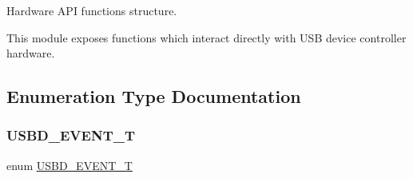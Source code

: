 Hardware A\+PI functions structure.

This module exposes functions which interact directly with U\+SB device controller hardware. 



\subsection{Enumeration Type Documentation}
\mbox{\label{group___u_s_b_d___h_w_ga61dde6aa35d2912927ef1b185eedaa13}} 
\subsubsection{\texorpdfstring{U\+S\+B\+D\+\_\+\+E\+V\+E\+N\+T\+\_\+T}{USBD\_EVENT\_T}}
{\footnotesize\ttfamily enum \hyperlink{group___u_s_b_d___h_w_ga61dde6aa35d2912927ef1b185eedaa13}{U\+S\+B\+D\+\_\+\+E\+V\+E\+N\+T\+\_\+T}}

